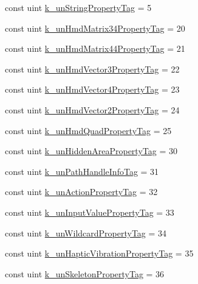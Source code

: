 \begin{DoxyCompactItemize}
\item 
const uint \mbox{\hyperlink{class_valve_1_1_v_r_1_1_open_v_r_ab05a7633d42ca931488f1cc9c9255546}{k\+\_\+un\+String\+Property\+Tag}} = 5
\item 
const uint \mbox{\hyperlink{class_valve_1_1_v_r_1_1_open_v_r_a36cdab36c7d9221be5f69566fa32d575}{k\+\_\+un\+Hmd\+Matrix34\+Property\+Tag}} = 20
\item 
const uint \mbox{\hyperlink{class_valve_1_1_v_r_1_1_open_v_r_a924798c7eee3e388ae4af8b742ebb9db}{k\+\_\+un\+Hmd\+Matrix44\+Property\+Tag}} = 21
\item 
const uint \mbox{\hyperlink{class_valve_1_1_v_r_1_1_open_v_r_ae80a6da2da564d3d5c5395bef9be1b66}{k\+\_\+un\+Hmd\+Vector3\+Property\+Tag}} = 22
\item 
const uint \mbox{\hyperlink{class_valve_1_1_v_r_1_1_open_v_r_aaaab835ef70539257f7b0826bdee178c}{k\+\_\+un\+Hmd\+Vector4\+Property\+Tag}} = 23
\item 
const uint \mbox{\hyperlink{class_valve_1_1_v_r_1_1_open_v_r_adaaaa2a2b5133d68a7bd954576f68909}{k\+\_\+un\+Hmd\+Vector2\+Property\+Tag}} = 24
\item 
const uint \mbox{\hyperlink{class_valve_1_1_v_r_1_1_open_v_r_adfd521445e7f9f4139401856d2066e07}{k\+\_\+un\+Hmd\+Quad\+Property\+Tag}} = 25
\item 
const uint \mbox{\hyperlink{class_valve_1_1_v_r_1_1_open_v_r_a7e5a51b208979ee6c00c09f4583868a0}{k\+\_\+un\+Hidden\+Area\+Property\+Tag}} = 30
\item 
const uint \mbox{\hyperlink{class_valve_1_1_v_r_1_1_open_v_r_a5b48d2c4d7e0cf67713f8c0c01b0c412}{k\+\_\+un\+Path\+Handle\+Info\+Tag}} = 31
\item 
const uint \mbox{\hyperlink{class_valve_1_1_v_r_1_1_open_v_r_ac3818c41a6521b4a2c4c3292dd11faea}{k\+\_\+un\+Action\+Property\+Tag}} = 32
\item 
const uint \mbox{\hyperlink{class_valve_1_1_v_r_1_1_open_v_r_a9dee17a95a122fb2eaa48b5857c27ff6}{k\+\_\+un\+Input\+Value\+Property\+Tag}} = 33
\item 
const uint \mbox{\hyperlink{class_valve_1_1_v_r_1_1_open_v_r_a987c2cd1ba36894ce3038497eaccf9ef}{k\+\_\+un\+Wildcard\+Property\+Tag}} = 34
\item 
const uint \mbox{\hyperlink{class_valve_1_1_v_r_1_1_open_v_r_a55eaca3fedb3a59c5fc1487949eda4c2}{k\+\_\+un\+Haptic\+Vibration\+Property\+Tag}} = 35
\item 
const uint \mbox{\hyperlink{class_valve_1_1_v_r_1_1_open_v_r_af96f19adb09168c9412cce4de635e2a7}{k\+\_\+un\+Skeleton\+Property\+Tag}} = 36

\end{DoxyCompactItemize}
